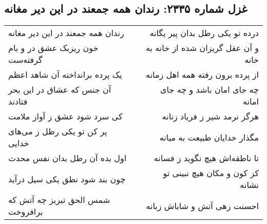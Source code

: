 \begin{center}
\section*{غزل شماره ۲۳۳۵: رندان همه جمعند در این دیر مغانه}
\label{sec:2335}
\begin{longtable}{l p{0.5cm} r}
رندان همه جمعند در این دیر مغانه
&&
درده تو یکی رطل بدان پیر یگانه
\\
خون ریزبک عشق در و بام گرفته‌ست
&&
و آن عقل گریزان شده از خانه به خانه
\\
یک پرده برانداخته آن شاهد اعظم
&&
از پرده برون رفته همه اهل زمانه
\\
آن جنس که عشاق در این بحر فتادند
&&
چه جای امان باشد و چه جای امانه
\\
کی سرد شود عشق ز آواز ملامت
&&
هرگز نرمد شیر ز فریاد زنانه
\\
پر کن تو یکی رطل ز می‌های خدایی
&&
مگذار خدایان طبیعت به میانه
\\
اول بده آن رطل بدان نفس محدث
&&
تا ناطقه‌اش هیچ نگوید ز فسانه
\\
چون بند شود نطق یکی سیل درآید
&&
کز کون و مکان هیچ نبینی تو نشانه
\\
شمس الحق تبریز چه آتش که برافروخت
&&
احسنت زهی آتش و شاباش زبانه
\\
\end{longtable}
\end{center}
